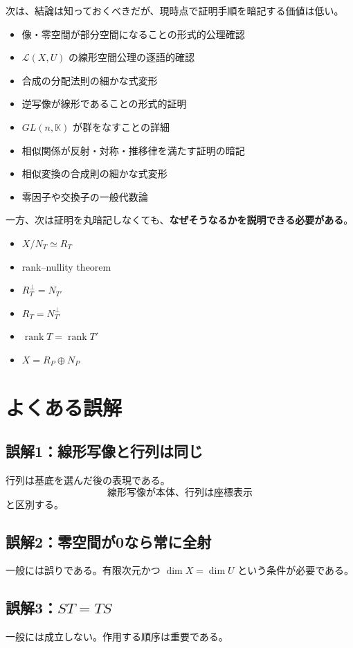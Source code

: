 \documentclass[a4paper,11pt]{ltjsarticle}
\newcommand{\K}{\mathbb{K}}
\newcommand{\rank}{\operatorname{rank}}
\newcommand{\Lcal}{\mathcal{L}}
\begin{document}
次は、結論は知っておくべきだが、現時点で証明手順を暗記する価値は低い。
\begin{itemize}
  \item 像・零空間が部分空間になることの形式的公理確認
  \item $\Lcal(X,U)$ の線形空間公理の逐語的確認
  \item 合成の分配法則の細かな式変形
  \item 逆写像が線形であることの形式的証明
  \item $GL(n,\K)$ が群をなすことの詳細
  \item 相似関係が反射・対称・推移律を満たす証明の暗記
  \item 相似変換の合成則の細かな式変形
  \item 零因子や交換子の一般代数論
\end{itemize}

一方、次は証明を丸暗記しなくても、\textbf{なぜそうなるかを説明できる必要がある}。
\begin{itemize}
  \item $X/N_T\simeq R_T$
  \item rank--nullity theorem
  \item $R_T^\perp=N_{T'}$
  \item $R_T=N_{T'}^\perp$
  \item $\rank T=\rank T'$
  \item $X=R_P\oplus N_P$
\end{itemize}

\section{よくある誤解}

\subsection*{誤解1：線形写像と行列は同じ}
行列は基底を選んだ後の表現である。
\[
\boxed{\text{線形写像が本体、行列は座標表示}}
\]
と区別する。

\subsection*{誤解2：零空間が0なら常に全射}
一般には誤りである。有限次元かつ $\dim X=\dim U$ という条件が必要である。

\subsection*{誤解3：$ST=TS$}
一般には成立しない。作用する順序は重要である。
\end{document}
